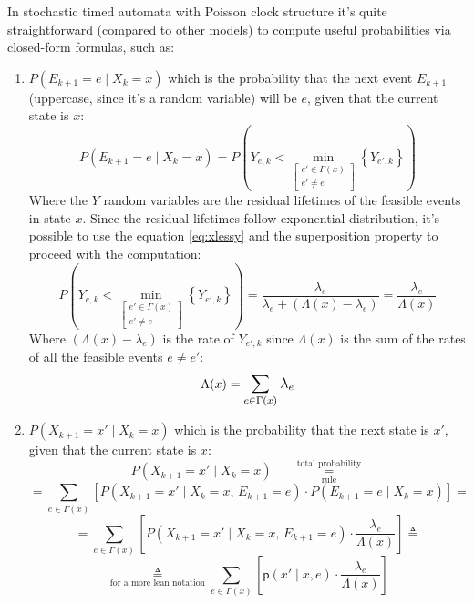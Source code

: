 \documentclass[12pt,a4paper]{article}
\newcommand*{\transp}{\mathsf{p}}
\begin{document}
\bigskip
\noindent
In stochastic timed automata with Poisson clock structure it's quite straightforward (compared to other models) to compute useful probabilities via closed-form formulas, such as:
\begin{enumerate}
\item $P(E_{k+1}=e \mid X_k=x)$ which is the probability that the next event $E_{k+1}$ (uppercase, since it's a random variable) will be $e$, given that the current state is $x$:
$$
P(E_{k+1}=e \mid X_k=x)=P\left(Y_{e,k} <
\min_{\left[
\begin{matrix}
e'\in \Gamma(x) \\
e'\neq e
\end{matrix}
\right]}
\left\lbrace Y_{e',k}\right\rbrace \right)
$$
Where the $Y$ random variables are the residual lifetimes of the feasible events in state $x$. Since the residual lifetimes follow exponential distribution, it's possible to use the equation \ref{eq:xlessy} and the superposition property to proceed with the computation:
\begin{equation}
\label{eq:inxnextstateise}
P\left(Y_{e,k} <
\min_{\left[
\begin{matrix}
e'\in \Gamma(x) \\
e'\neq e
\end{matrix}
\right]}
\left\lbrace Y_{e',k}\right\rbrace \right)
=\frac{\lambda_e}{\lambda_e+(\Lambda(x)-\lambda_e)}=\frac{\lambda_e}{\Lambda(x)}
\end{equation}
\noindent
Where $(\Lambda(x)-\lambda_e)$ is the rate of $Y_{e',k}$ since $\Lambda(x)$ is the sum of the rates of all the feasible events $e \neq e'$:
$$
\Lambda(x) = \mathlarger{\sum_{e \in \Gamma(x)}\lambda_e}
$$

\item $P(X_{k+1}=x' \mid X_k=x)$ which is the probability that the next state is $x'$, given that the current state is $x$:
$$
P(X_{k+1}=x' \mid X_k=x) \hspace{20pt}\underset{\textrm{rule}}{\overset{\textrm{total probability}}{=}}
$$
$$
=\sum_{e\in \Gamma(x)}{
\left[
P\left(
X_{k+1}=x' \mid X_k=x\textrm{, }E_{k+1}=e
\right)\cdot
P\left(
E_{k+1}=e \mid X_k=x
\right)
\right]
}=
$$
$$
=
\sum_{e\in \Gamma(x)}{
\left[
P\left(
X_{k+1}=x' \mid X_k=x\textrm{, }E_{k+1}=e
\right)\cdot
\frac{\lambda_e}{\Lambda(x)}
\right]}\triangleq
$$
$$
\underset{\textrm{for a more lean notation}}{\triangleq}
\sum_{e\in \Gamma(x)}{
\left[
\transp\left(x' \mid x,e
\right)\cdot
\frac{\lambda_e}{\Lambda(x)}
\right]}
$$
\end{enumerate}
\end{document}
